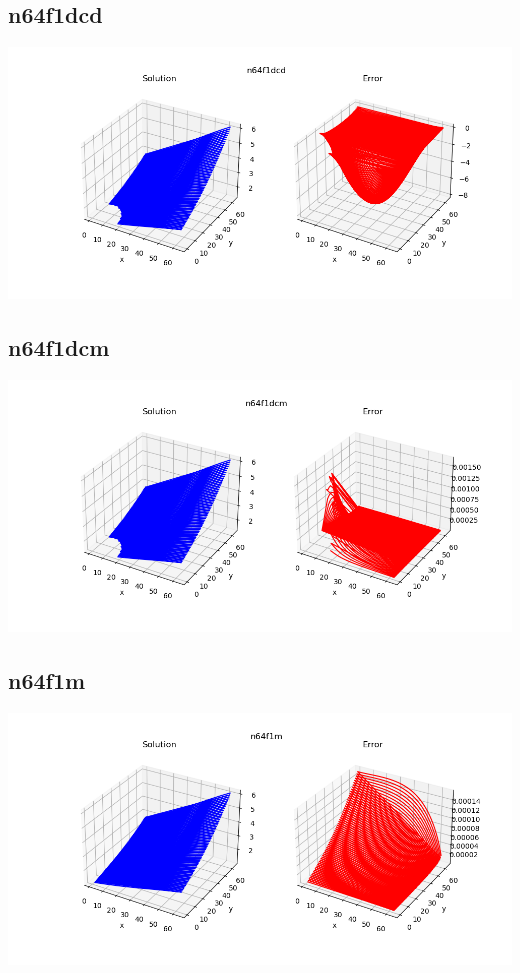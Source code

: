 \subsection*{n64f1dcd}
\includegraphics[scale=0.6]{../../image/n64f1dcd.png}
\subsection*{n64f1dcm}
\includegraphics[scale=0.6]{../../image/n64f1dcm.png}
\subsection*{n64f1m}
\includegraphics[scale=0.6]{../../image/n64f1m.png}
